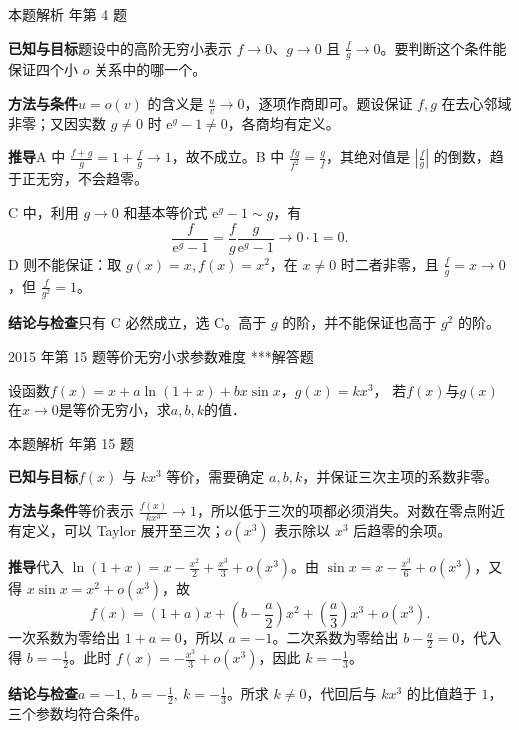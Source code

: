 \documentclass[UTF8,zihao=-4,fontset=fandol]{ctexart}
\newcounter{BankQuestion}
\newcommand{\QuestionPage}[7]{%
  \stepcounter{BankQuestion}%
  \par\noindent\begin{minipage}{\linewidth}
  \raggedright
  {\small\textcolor{black!60}{#3\quad #5\quad 难度 #7}\hfill\textcolor{accent}{#2}}\par\smallskip}
\newcommand{\QuestionEnd}{\end{minipage}\par\medskip}
\newcommand{\QuestionPage}[7]{%
  \clearpage
  \stepcounter{BankQuestion}%
  {\small\textcolor{accent}{#1\hfill #2}}\par\medskip
  {\small\textcolor{black!60}{#3\quad #5\quad 难度 #7\hfill \arabic{BankQuestion} / 234}}\par\vspace{9bp}}
\newcommand{\QuestionEnd}{}
\newenvironment{QuestionSolution}[1]{%
  \clearpage
  {\small\textcolor{black!60}{本题解析\quad #1}}\par\medskip
}{\par\clearpage}
\begin{document}
\begin{QuestionSolution}{2025 年第 4 题}
\textbf{已知与目标}\quad 题设中的高阶无穷小表示 \(f\to0\)、\(g\to0\) 且 \(\frac{f}{g}\to0\)。要判断这个条件能保证四个小 \(o\) 关系中的哪一个。

\textbf{方法与条件}\quad \(u=o(v)\) 的含义是 \(\frac{u}{v}\to0\)，逐项作商即可。题设保证 \(f,g\) 在去心邻域非零；又因实数 \(g\ne0\) 时 \(\mathrm e^g-1\ne0\)，各商均有定义。

\textbf{推导}\quad A 中 \(\frac{f+g}{g}=1+\frac{f}{g}\to1\)，故不成立。B 中 \(\frac{fg}{f^2}=\frac{g}{f}\)，其绝对值是 \(|\frac{f}{g}|\) 的倒数，趋于正无穷，不会趋零。

C 中，利用 \(g\to0\) 和基本等价式 \(\mathrm e^g-1\sim g\)，有
\[
\frac{f}{\mathrm{e}^g-1}=\frac{f}{g}\frac{g}{\mathrm{e}^g-1}\longrightarrow0\cdot1=0.
\]
D 则不能保证：取 \(g(x)=x,f(x)=x^2\)，在 \(x\ne0\) 时二者非零，且 \(\frac{f}{g}=x\to0\)，但 \(\frac{f}{g^2}=1\)。

\textbf{结论与检查}\quad 只有 C 必然成立，选 \(\boxed{\mathrm C}\)。高于 \(g\) 的阶，并不能保证也高于 \(g^2\) 的阶。
\end{QuestionSolution}

\QuestionPage{1.4 无穷小量与无穷大量}{解答题}{2015 年第 15 题}{2}{等价无穷小求参数}{038 / 234}{***}
设函数$f(x) = x + a\ln(1 + x) + bx\sin x$，$g(x) = kx^3$，
若$f(x)$与$g(x)$在$x \to 0$是等价无穷小，求$a,b,k$的值．
\QuestionEnd

\begin{QuestionSolution}{2015 年第 15 题}
\textbf{已知与目标}\quad \(f(x)\) 与 \(kx^3\) 等价，需要确定 \(a,b,k\)，并保证三次主项的系数非零。

\textbf{方法与条件}\quad 等价表示 \(\frac{f(x)}{kx^3}\to1\)，所以低于三次的项都必须消失。对数在零点附近有定义，可以 Taylor 展开至三次；\(o(x^3)\) 表示除以 \(x^3\) 后趋零的余项。

\textbf{推导}\quad 代入 \(\ln(1+x)=x-\frac{x^2}{2}+\frac{x^3}{3}+o(x^3)\)。由 \(\sin x=x-\frac{x^3}{6}+o(x^3)\)，又得 \(x\sin x=x^2+o(x^3)\)，故
\[
f(x)=(1+a)x+(b-\frac{a}{2})x^2+(\frac{a}{3})x^3+o(x^3).
\]
一次系数为零给出 \(1+a=0\)，所以 \(a=-1\)。二次系数为零给出 \(b-\frac{a}{2}=0\)，代入得 \(b=-\frac{1}{2}\)。此时 \(f(x)=-\frac{x^3}{3}+o(x^3)\)，因此 \(k=-\frac{1}{3}\)。

\textbf{结论与检查}\quad \(\boxed{a=-1,\ b=-\frac{1}{2},\ k=-\frac{1}{3}}\)。所求 \(k\ne0\)，代回后与 \(kx^3\) 的比值趋于 \(1\)，三个参数均符合条件。
\end{QuestionSolution}
\end{document}
